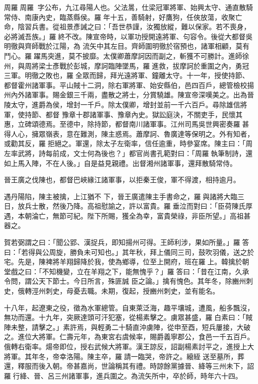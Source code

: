 
\begin{pinyinscope}

 周羅周羅，字公布，九江尋陽人也。父法暠，仕梁冠軍將軍、始興太守、通直散騎常侍、南康內史，臨蒸縣侯。羅年十五，善騎射，好鷹狗，任俠放蕩，收聚亡命，陰習兵書。從祖景彥誡之曰：「吾世恭謹，汝獨放縱，難以保家。若不喪身，必將滅吾族。」羅終不改。陳宣帝時，以軍功授開遠將軍、句容令。後從大都督吳明徹與齊師戰於江陽，為
 流矢中其左目。齊師圍明徹於宿預也，諸軍相顧，莫有鬥心。羅躍馬突進，莫不披靡。太僕卿蕭摩訶因而副之，斬獲不可勝計。進師徐州，與周將梁士彥戰於彭城，摩訶臨陣墜馬，羅進救，拔摩訶於重圍之內，勇冠三軍。明徹之敗也，羅全眾而歸，拜光遠將軍、鐘離太守。十一年，授使持節、都督霍州諸軍事。平山賊十二洞，除右軍將軍、始安縣伯，邑四百戶，總管檢校揚州內外諸軍事。賜金銀三千兩，盡散之將士，分賞驍雄。陳宣帝深嘆美之。出為晉陵太守，進爵為侯，增封一千戶。除太僕卿，增封並前一千六百戶。尋除雄信將軍，使持節、都督
 豫章十郡諸軍事、豫章內史。獄訟庭決，不關吏手，民懷其惠，立碑頌德焉。至德中，除持節，都督南川諸軍事。江州司馬吳世興密奏羅甚得人心，擁眾嶺表，意在難測，陳主惑焉。蕭摩訶、魯廣達等保明之。外有知者，或勸其反，羅拒絕之。軍還，除太子左衛率，信任逾重，時參宴席。陳主曰：「周左率武將，詩每前成，文士何為後也？」都官尚書孔範對曰：「周羅執筆制詩，還如上馬入陣，不在人後。」自是益見親禮。出督湘州諸軍事，還拜散騎常侍。



 晉王廣之伐陳也，都督巴峽緣江諸軍事，以拒秦王俊，軍不得渡，相持逾月。



 遇丹陽陷，陳主被擒，上江猶不
 下，晉王廣遣陳主手書命之，羅與諸將大臨三日，放兵士散，然後乃降。高祖慰諭之，許以富貴。羅垂泣而對曰：「臣荷陳氏厚遇，本朝淪亡，無節可紀。陛下所賜，獲全為幸，富貴榮祿，非臣所望。」高祖甚器之。



 賀若弼謂之曰：「聞公郢、漢捉兵，即知揚州可得。王師利涉，果如所量。」羅答曰：「若得與公周旋，勝負未可知也。」其年秋，拜上儀同三司，鼓吹羽儀，送之於宅。先是，陳裨將羊翔歸降於我，使為鄉導，位至上開府，班在羅上。韓擒於朝堂戲之曰：「不知機變，立在羊翔之下，能無愧乎？」羅答曰：「昔在江南，久承令問，謂公天下節士。今日所言，殊匪誠
 臣之論。」擒有愧色。其年冬，除豳州刺史，俄轉涇州刺史，母憂去職。未期，復起，授豳州刺史，並有能名。



 十八年，起遼東之役，徵為水軍總管。自東萊泛海，趣平壤城，遭風，船多飄沒，無功而還。十九年，突厥達頭可汗犯塞，從楊素擊之。虜眾甚盛，羅白素曰：「賊陣未整，請擊之。」素許焉，與輕勇二十騎直沖虜陣，從申至酉，短兵屢接，大破之。進位大將軍。仁壽元年，為東宮右虞候率，賜爵義寧郡公，食邑一千五百戶。俄轉右衛率。煬帝即位，授右武候大將軍。漢王諒反，詔副楊素討平之，進授上大將軍。其年冬，帝幸洛陽。陳主卒，羅請一臨哭，帝許之。縗絰
 送至墓所，葬還，釋服而後入朝。帝甚嘉尚，世論稱其有禮。時諒餘黨據晉、絳等三州未下，詔羅行絳、晉、呂三州諸軍事，進兵圍之。為流矢所中，卒於師，時年六十四。




\end{pinyinscope}
